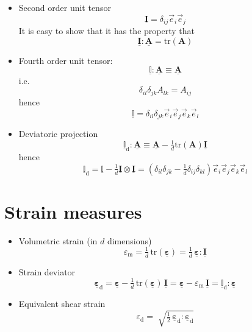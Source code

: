 \documentclass[times,namecite]{goose-article}
\newcommand\T[1]{\underline{\bm{{#1}}}}
\newcommand\TT[1]{\underline{\mathbb{{#1}}}}
\begin{document}
\begin{itemize}
%
\item Second order unit tensor
\begin{equation}
  \T{I} = \delta_{ij} \vec{e}_i \vec{e}_j
\end{equation}
It is easy to show that it has the property that
\begin{equation}
  \T{I} : \T{A} = \mathrm{tr} ( \bm{A} )
\end{equation}
%
\item Fourth order unit tensor:
\begin{equation}
  \TT{I} : \T{A} \equiv \T{A}
\end{equation}
i.e.
\begin{equation}
  \delta_{il} \delta_{jk} A_{lk} = A_{ij}
\end{equation}
hence
\begin{equation}
  \TT{I} = \delta_{il} \delta_{jk} \vec{e}_i \vec{e}_j \vec{e}_k \vec{e}_l
\end{equation}
%
\item Deviatoric projection
\begin{equation}
  \TT{I}_\mathrm{d} : \T{A} \equiv \T{A} - \tfrac{1}{d} \mathrm{tr} ( \bm{A} ) \T{I}
\end{equation}
hence
\begin{equation}
  \TT{I}_\mathrm{d} = \TT{I} - \tfrac{1}{d} \T{I} \otimes \T{I}
  = \left( \delta_{il} \delta_{jk} - \tfrac{1}{d} \delta_{ij} \delta_{kl} \right) \vec{e}_i \vec{e}_j \vec{e}_k \vec{e}_l
\end{equation}
%
\end{itemize}

\section{Strain measures}
\label{sec:nomenclature::strain}

\begin{itemize}
%
\item Volumetric strain (in $d$ dimensions)
\begin{equation}
  \varepsilon_\mathrm{m}
  = \tfrac{1}{d} \, \mathrm{tr} ( \T{\varepsilon} )
  = \tfrac{1}{d} \, \T{\varepsilon} : \T{I}
\end{equation}
%
\item Strain deviator
\begin{equation}
  \T{\varepsilon}_\mathrm{d}
  = \T{\varepsilon} - \tfrac{1}{d} \, \mathrm{tr} ( \T{\varepsilon} ) \, \T{I}
  = \T{\varepsilon} - \varepsilon_\mathrm{m} \, \T{I}
  = \TT{I}_\mathrm{d} : \T{\varepsilon}
\end{equation}
%
\item Equivalent shear strain
\begin{equation}
  \varepsilon_\mathrm{d}
  = \; \sqrt{
    \tfrac{1}{2} \, \T{\varepsilon}_\mathrm{d} : \T{\varepsilon}_\mathrm{d}
  }
\end{equation}
%
\end{itemize}
\end{document}
